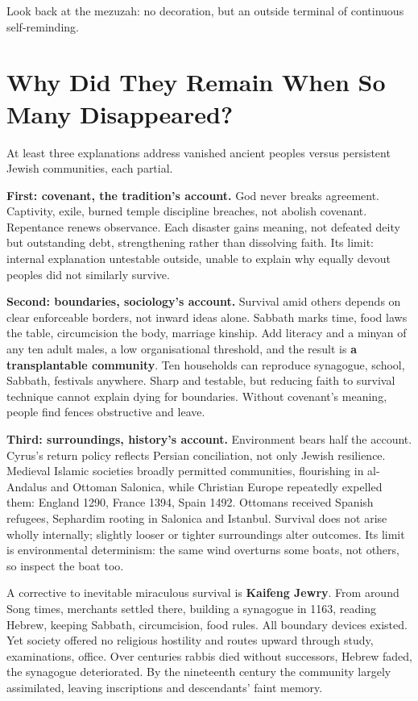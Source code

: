 Look back at the mezuzah: no decoration, but an outside terminal of continuous self-reminding.

\section[Why Did This Community Survive?]{Why Did They Remain When So Many Disappeared?}
At least three explanations address vanished ancient peoples versus persistent Jewish communities, each partial.

\textbf{First: covenant, the tradition's account.} God never breaks agreement. Captivity, exile, burned temple discipline breaches, not abolish covenant. Repentance renews observance. Each disaster gains meaning, not defeated deity but outstanding debt, strengthening rather than dissolving faith. Its limit: internal explanation untestable outside, unable to explain why equally devout peoples did not similarly survive.

\textbf{Second: boundaries, sociology's account.} Survival amid others depends on clear enforceable borders, not inward ideas alone. Sabbath marks time, food laws the table, circumcision the body, marriage kinship. Add literacy and a minyan of any ten adult males, a low organisational threshold, and the result is \textbf{a transplantable community}. Ten households can reproduce synagogue, school, Sabbath, festivals anywhere. Sharp and testable, but reducing faith to survival technique cannot explain dying for boundaries. Without covenant's meaning, people find fences obstructive and leave.

\textbf{Third: surroundings, history's account.} Environment bears half the account. Cyrus's return policy reflects Persian conciliation, not only Jewish resilience. Medieval Islamic societies broadly permitted communities, flourishing in al-Andalus and Ottoman Salonica, while Christian Europe repeatedly expelled them: England 1290, France 1394, Spain 1492. Ottomans received Spanish refugees, Sephardim rooting in Salonica and Istanbul. Survival does not arise wholly internally; slightly looser or tighter surroundings alter outcomes. Its limit is environmental determinism: the same wind overturns some boats, not others, so inspect the boat too.

A corrective to inevitable miraculous survival is \textbf{Kaifeng Jewry}. From around Song times, merchants settled there, building a synagogue in 1163, reading Hebrew, keeping Sabbath, circumcision, food rules. All boundary devices existed. Yet society offered no religious hostility and routes upward through study, examinations, office. Over centuries rabbis died without successors, Hebrew faded, the synagogue deteriorated. By the nineteenth century the community largely assimilated, leaving inscriptions and descendants' faint memory.

